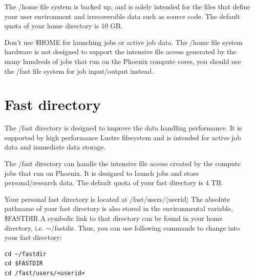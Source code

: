 \begin{information}
The /home file system is backed up, and is solely intended for the files that define your user environment and irrecoverable data such as source code. The default quota of your home directory is 10 GB.
\end{information}
\begin{information}
Don't use \$HOME for launching jobs or active job data. The /home file system hardware is not designed to support the intensive file access generated by the many hundreds of jobs that run on the Phoenix compute cores, you should use the /fast file system for job input/output instead.
\end{information}

\section{Fast directory}
The /fast directory is designed to improve the data handling performance. It is supported by high performance Lustre filesystem and is intended for active job data and immediate data storage. \\
\begin{information}
The /fast directory can handle the intensive file access created by the compute jobs that run on Phoenix. It is designed to launch jobs and store personal/research data. The default quota of your fast directory is 4 TB. \\
\end{information}
Your personal fast directory is located at /fast/users/$\langle$userid$\rangle$
The absolute pathname of your fast directory is also stored in the environmental variable, \$FASTDIR
A symbolic link to that directory can be found in your home directory, i.e. $\mathtt{\sim}$/fastdir.
Thus, you can use following commands to change into your fast directory:
\begin{steps}
\begin{lstlisting}
cd ~/fastdir
cd $FASTDIR
cd /fast/users/<userid>
\end{lstlisting}
\end{steps}


